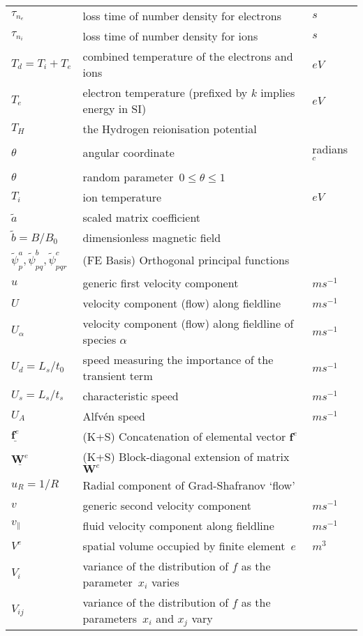 \begin{longtable}{|p{3.0cm}|p{10.0cm}|p{3.0cm}|}
$\tau_{n_e}$ & loss time of number density for electrons   & $s$ \\
$\tau_{n_i}$ & loss time of number density for ions   & $s$ \\
$T_d=T_i+T_e$ & combined temperature of the electrons and ions  & $eV$ \\
$T_e$ & electron temperature (prefixed by $k$ implies energy in SI)  & $eV$ \\
$T_H$ & the Hydrogen reionisation potential  & \\
$\theta$ & angular coordinate & radians $^c$ \\
$\theta$ & random parameter~$0\leq\theta\leq 1$ & \\
$T_i$ & ion temperature  & $eV$ \\
$\tilde{a}$ & scaled matrix coefficient & \\
$\tilde{b}=B/B_0$ & dimensionless magnetic field & \\
$\tilde{\psi}^a_p, \tilde{\psi}^b_{pq}, \tilde{\psi}^c_{pqr}$ &  (FE Basis) Orthogonal principal functions & \\
$u$ & generic first velocity component  & $m s^{-1}$ \\
$U$ & velocity component (flow) along fieldline  & $m s^{-1}$ \\
$U_\alpha$ & velocity component (flow) along fieldline of species $\alpha$ & $m s^{-1}$ \\
$U_d =L_s/t_0$ & speed measuring the importance of the transient term  & $m s^{-1}$ \\
$U_s =L_s/t_s$ & characteristic speed  & $m s^{-1}$ \\
$U_A$  & Alfv\'{e}n speed  & $m s^{-1}$ \\
$\underline{\boldsymbol{f}^e}$ &  (K+S) Concatenation of elemental vector $\boldsymbol{f}^e$ & \\
$\underline{\boldsymbol{W}^e}$ &  (K+S) Block-diagonal extension of matrix $\boldsymbol{W}^e$ & \\
$u_R=1/R$ & Radial component of Grad-Shafranov `flow' & \\
$v$ & generic second velocity component  & $m s^{-1}$ \\
$v_{\|}$ & fluid velocity component along fieldline  &  $m s^{-1}$ \\
$V^e$ & spatial volume occupied by finite element~$e$  & $m^3$ \\
$V_i$ & variance of the distribution of $f$ as the parameter~$x_i$ varies  & \\
$V_{ij}$ & variance of the distribution of $f$ as the parameters~$x_i$ and $x_j$ vary  & \\

\end{longtable}
